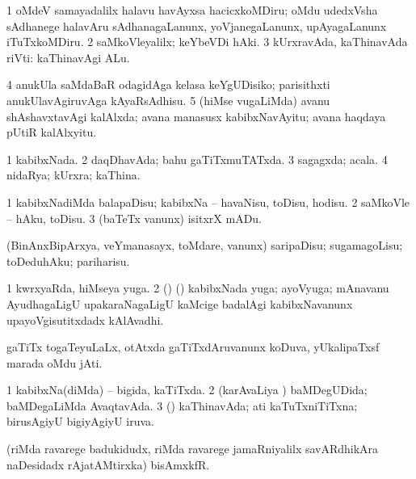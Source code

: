 \noindent
\gl{\nuga}
\bmng
\bnum
\num{1}  oMdeV samayadalilx halavu havAyxsa hacicxkoMDiru; oMdu udedxVsha sAdhanege halavAru sAdhanagaLanunx, yoVjanegaLanunx, upAyagaLanunx iTuTxkoMDiru. 
\num{2}  saMkoVleyalilx; keYbeVDi hAki. 
\num{3}  kUrxravAda, kaThinavAda riVti:  kaThinavAgi ALu. 
\num{4}  anukUla saMdaBaR odagidAga kelasa keYgUDisiko; parisithxti anukUlavAgiruvAga kAyaRsAdhisu. 
\num{5}  (hiMse \mo vugaLiMda) avanu shAshavxtavAgi kalAlxda; avana manasusx kabibxNavAyitu; avana haqdaya pUtiR kalAlxyitu. 
\enum
\emng
\eentry

\bentry
{}
\gl{\gu}
\bmng
\bnum
\num{1} kabibxNada. 
\num{2} daqDhavAda; bahu gaTiTxmuTATxda. 
\num{3} sagagxda; acala. 
\num{4} nidaRya; kUrxra; kaThina. 
\enum
\emng
\eentry

\bentry
{}
\gl{\sakirx}
\bmng
\bnum
\num{1} kabibxNadiMda balapaDisu; kabibxNa -- havaNisu, toDisu, hodisu. 
\num{2} saMkoVle -- hAku, toDisu. 
\num{3} (baTeTx \mo vanunx) isitxrX mADu. 
\enum
\emng

\noindent 
\gl{\nuga}
\bmng
{} (BinAnxBipArxya, veYmanasayx, toMdare, \mo vanunx) saripaDisu; sugamagoLisu; toDeduhAku; pariharisu. 
\emng
\eentry

\bentry
{}
\gl{\nA}
\bmng
\bnum
\num{1} kwrxyaRda, hiMseya yuga. 
\num{2} () (\pArxkatx) kabibxNada yuga; ayoVyuga; mAnavanu AyudhagaLigU upakaraNagaLigU kaMcige badalAgi kabibxNavanunx upayoVgisutitxdadx kAlAvadhi. 
\enum
\emng
\eentry

\bentry
{}
\gl{\nA}
\bmng
gaTiTx togaTeyuLaLx, otAtxda gaTiTxdAruvanunx koDuva, yUkalipaTxsf marada oMdu jAti. 
\emng
\eentry

\bentry
{}
\gl{\gu}
\bmng
\bnum
\num{1} kabibxNa(diMda) -- bigida, kaTiTxda. 
\num{2} (karAvaLiya \vi) baMDegUDida; baMDegaLiMda AvaqtavAda. 
\num{3} (\rUpa) kaThinavAda; ati kaTuTxniTiTxna; birusAgiyU bigiyAgiyU iruva. 
\enum
\emng
\eentry

\bentry
{}
\gl{\nA}
\bmng
(riMda ravarege badukidudx, riMda ravarege jamaRniyalilx savARdhikAra naDesidadx rAjatAMtirxka) bisAmxkfR. 
\emng
\eentry

